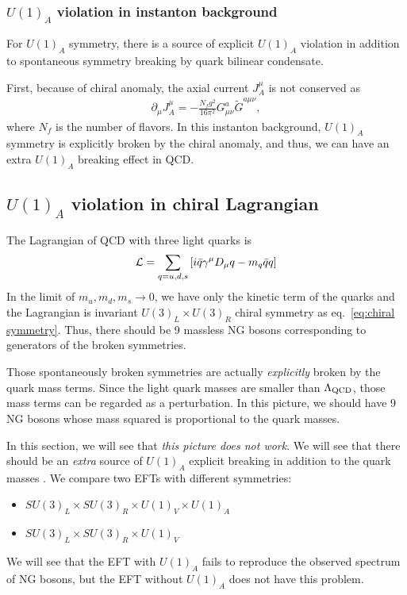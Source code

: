 \documentclass[11pt,a4paper]{article}
\begin{document}
\subsubsection{$U(1)_A$ violation in instanton background}
For $U(1)_A$ symmetry, there is a source of explicit $U(1)_A$ violation in addition to spontaneous symmetry breaking by quark bilinear condensate.

First, because of chiral anomaly, the axial current $J_A^\mu$ is not conserved as \cite{tHooft:1976rip, tHooft:1976snw}
\begin{align}
    \partial_\mu J_A^\mu = -\frac{N_f g^2}{16\pi^2} G_{\mu\nu}^a \tilde G^{a\mu\nu},
\end{align}
where $N_f$ is the number of flavors.
In this instanton background, $U(1)_A$ symmetry is explicitly broken by the chiral anomaly, and thus, we can have an extra $U(1)_A$ breaking effect in QCD.

\subsection{$U(1)_A$ violation in chiral Lagrangian}
The Lagrangian of QCD with three light quarks is
\begin{align}
    {\cal L} = \sum_{q=u,d,s} \left[ i\bar q \gamma^\mu D_\mu q - m_q \bar q q \right]
\end{align}
In the limit of $m_u, m_d, m_s \to 0$, we have only the kinetic term of the quarks and the Lagrangian is invariant $U(3)_L \times U(3)_R$ chiral symmetry as eq.~\eqref{eq:chiral symmetry}.
Thus, there should be 9 massless NG bosons corresponding to generators of the broken symmetries.

Those spontaneously broken symmetries are actually \textit{explicitly} broken by the quark mass terms. Since the light quark masses are smaller than $\Lambda_{\rm QCD}$, those mass terms can be regarded as a perturbation. In this picture, we should have 9 NG bosons whose mass squared is proportional to the quark masses.

In this section, we will see that \textit{this picture does not work}. We will see that there should be an \textit{extra} source of $U(1)_A$ explicit breaking in addition to the quark masses \cite{Weinberg:1975ui}.
We compare two EFTs with different symmetries:
\begin{itemize}
    \item $SU(3)_L \times SU(3)_R \times U(1)_V \times U(1)_A$
    \item $SU(3)_L \times SU(3)_R \times U(1)_V$
\end{itemize}
We will see that the EFT with $U(1)_A$ fails to reproduce the observed spectrum of NG bosons, but the EFT without $U(1)_A$ does not have this problem.
\end{document}
